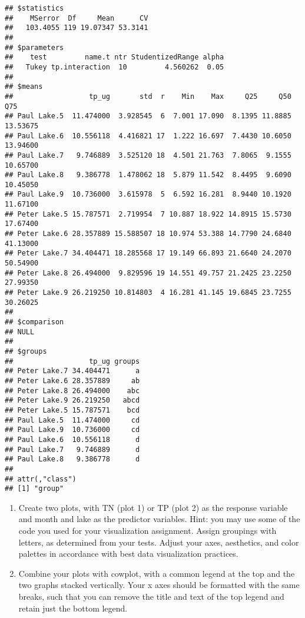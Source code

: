 \documentclass[
]{article}
\begin{document}
\begin{verbatim}
## $statistics
##    MSerror  Df     Mean      CV
##   103.4055 119 19.07347 53.3141
## 
## $parameters
##    test         name.t ntr StudentizedRange alpha
##   Tukey tp.interaction  10         4.560262  0.05
## 
## $means
##                  tp_ug       std  r    Min    Max     Q25     Q50      Q75
## Paul Lake.5  11.474000  3.928545  6  7.001 17.090  8.1395 11.8885 13.53675
## Paul Lake.6  10.556118  4.416821 17  1.222 16.697  7.4430 10.6050 13.94600
## Paul Lake.7   9.746889  3.525120 18  4.501 21.763  7.8065  9.1555 10.65700
## Paul Lake.8   9.386778  1.478062 18  5.879 11.542  8.4495  9.6090 10.45050
## Paul Lake.9  10.736000  3.615978  5  6.592 16.281  8.9440 10.1920 11.67100
## Peter Lake.5 15.787571  2.719954  7 10.887 18.922 14.8915 15.5730 17.67400
## Peter Lake.6 28.357889 15.588507 18 10.974 53.388 14.7790 24.6840 41.13000
## Peter Lake.7 34.404471 18.285568 17 19.149 66.893 21.6640 24.2070 50.54900
## Peter Lake.8 26.494000  9.829596 19 14.551 49.757 21.2425 23.2250 27.99350
## Peter Lake.9 26.219250 10.814803  4 16.281 41.145 19.6845 23.7255 30.26025
## 
## $comparison
## NULL
## 
## $groups
##                  tp_ug groups
## Peter Lake.7 34.404471      a
## Peter Lake.6 28.357889     ab
## Peter Lake.8 26.494000    abc
## Peter Lake.9 26.219250   abcd
## Peter Lake.5 15.787571    bcd
## Paul Lake.5  11.474000     cd
## Paul Lake.9  10.736000     cd
## Paul Lake.6  10.556118      d
## Paul Lake.7   9.746889      d
## Paul Lake.8   9.386778      d
## 
## attr(,"class")
## [1] "group"
\end{verbatim}

\begin{enumerate}
\def\labelenumi{\arabic{enumi}.}
\setcounter{enumi}{6}
\item
  Create two plots, with TN (plot 1) or TP (plot 2) as the response
  variable and month and lake as the predictor variables. Hint: you may
  use some of the code you used for your visualization assignment.
  Assign groupings with letters, as determined from your tests. Adjust
  your axes, aesthetics, and color palettes in accordance with best data
  visualization practices.
\item
  Combine your plots with cowplot, with a common legend at the top and
  the two graphs stacked vertically. Your x axes should be formatted
  with the same breaks, such that you can remove the title and text of
  the top legend and retain just the bottom legend.
\end{enumerate}
\end{document}

